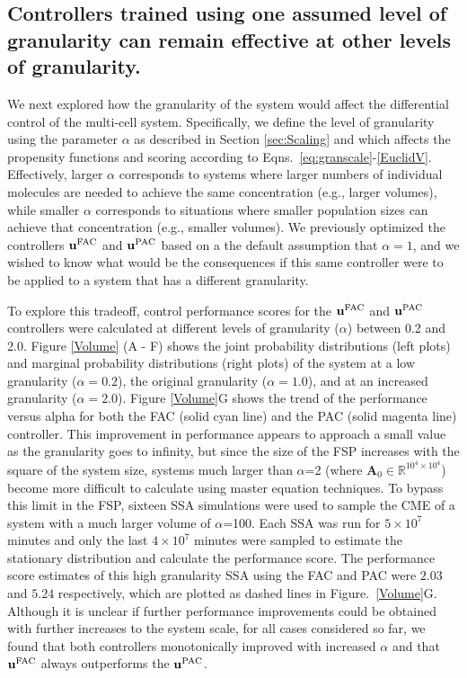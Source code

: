 \documentclass[12pt]{iopart}
\begin{document}
\subsection{Controllers trained using one assumed level of granularity can remain effective at other levels of granularity.}\label{sec:ResGran}

We next explored how the granularity of the system would affect the differential control of the multi-cell system. Specifically, we define the level of granularity using the parameter $\alpha$ as described in Section \ref{sec:Scaling} and which affects the propensity functions and scoring according to Eqns.\ \ref{eq:granscale}-\ref{EuclidV}. Effectively, larger $\alpha$ corresponds to systems where larger numbers of individual molecules are needed to achieve the same concentration (e.g., larger volumes), while smaller $\alpha$ corresponds to situations where smaller population sizes can achieve that concentration (e.g., smaller volumes). We previously optimized the controllers $\mathbf{u}^{\rm FAC}$ and $\mathbf{u}^{\rm PAC}$ based on a the default assumption that $\alpha=1$, and we wished to know what would be the consequences if this same controller were to be applied to a system that has a different granularity. 

To explore this tradeoff, control performance scores for the $\mathbf{u}^{\rm FAC}$ and $\mathbf{u}^{\rm PAC}$ controllers were calculated at different levels of granularity ($\alpha$) between 0.2 and 2.0.  Figure \ref{Volume} (A - F) shows the joint probability distributions (left plots) and marginal probability distributions (right plots) of the system at a low granularity ($\alpha=0.2$), the original granularity ($\alpha=1.0$), and at an increased granularity ($\alpha=2.0$). 
Figure \ref{Volume}G shows the trend of the performance versus alpha for both the FAC (solid cyan line) and the PAC (solid magenta line) controller.  This improvement in performance appears to approach a small value as the granularity goes to infinity, but since the size of the FSP increases with the square of the system size, systems much larger than $\alpha$=2 (where $\mathbf{A}_0\in \mathbb{R}^{10^4\times10^4}$) become more difficult to calculate using master equation techniques. To bypass this limit in the FSP, sixteen SSA simulations were used to sample the CME of a system with a much larger volume of $\alpha$=100. Each SSA was run for $5\times10^7$ minutes and only the last $4\times10^7$ minutes were sampled to estimate the stationary distribution and calculate the performance score. The performance score estimates of this high granularity SSA using the FAC and PAC were $2.03$ and $5.24$ respectively, which are plotted as dashed lines in Figure.\ \ref{Volume}G. Although it is unclear if further performance improvements could be obtained with further increases to the system scale, for all cases considered so far, we found that both controllers monotonically improved with increased $\alpha$ and that $\mathbf{u}^{\rm FAC}$ always outperforms the $\mathbf{u}^{\rm PAC}$. 
\end{document}
